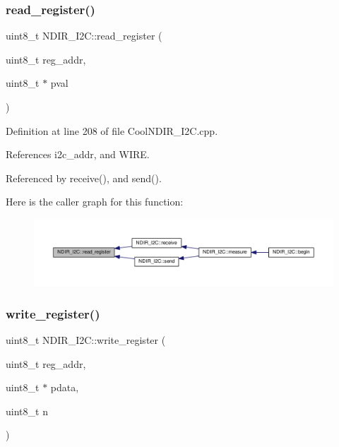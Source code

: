 \subsubsection{\texorpdfstring{read\+\_\+register()}{read\_register()}}
{\footnotesize\ttfamily uint8\+\_\+t N\+D\+I\+R\+\_\+\+I2\+C\+::read\+\_\+register (\begin{DoxyParamCaption}\item[{uint8\+\_\+t}]{reg\+\_\+addr,  }\item[{uint8\+\_\+t $\ast$}]{pval }\end{DoxyParamCaption})\hspace{0.3cm}{\ttfamily [private]}}



Definition at line 208 of file Cool\+N\+D\+I\+R\+\_\+\+I2\+C.\+cpp.



References i2c\+\_\+addr, and W\+I\+RE.



Referenced by receive(), and send().

Here is the caller graph for this function\+:\nopagebreak
\begin{figure}[H]
\begin{center}
\leavevmode
\includegraphics[width=350pt]{d6/ddb/class_n_d_i_r___i2_c_aa72058e6e7c6174b14466fee4b2df1e0_icgraph}
\end{center}
\end{figure}
\mbox{\label{class_n_d_i_r___i2_c_a5de6a044b00e985f035edca07521e319}} 
\subsubsection{\texorpdfstring{write\+\_\+register()}{write\_register()}\hspace{0.1cm}{\footnotesize\ttfamily [1/2]}}
{\footnotesize\ttfamily uint8\+\_\+t N\+D\+I\+R\+\_\+\+I2\+C\+::write\+\_\+register (\begin{DoxyParamCaption}\item[{uint8\+\_\+t}]{reg\+\_\+addr,  }\item[{uint8\+\_\+t $\ast$}]{pdata,  }\item[{uint8\+\_\+t}]{n }\end{DoxyParamCaption})\hspace{0.3cm}{\ttfamily [private]}}



